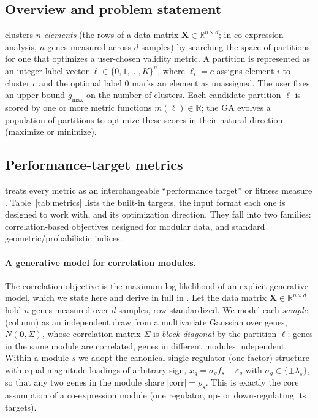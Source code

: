 \subsection*{Overview and problem statement}
\tool{} clusters $n$ \emph{elements} (the rows of a data matrix
$\mathbf{X}\in\mathbb{R}^{n\times d}$; in co-expression analysis, $n$ genes
measured across $d$ samples) by searching the space of partitions for one that
optimizes a user-chosen validity metric. A partition is represented as an
integer label vector $\boldsymbol{\ell}\in\{0,1,\dots,K\}^{n}$, where
$\ell_i = c$ assigns element $i$ to cluster $c$ and the optional label $0$ marks
an element as unassigned. The user fixes an upper bound $g_{\max}$ on the number
of clusters. Each candidate partition $\boldsymbol{\ell}$ is scored by one or
more metric functions $m(\boldsymbol{\ell})\in\mathbb{R}$; the GA evolves a
population of partitions to optimize these scores in their natural direction
(maximize or minimize).

\subsection*{Performance-target metrics}
\tool{} treats every metric as an interchangeable ``performance target'' or fitness measure \cite{wirsanskyHGA2020}. Table~\ref{tab:metrics} lists the built-in targets, the input format each one is designed to work with, and its optimization direction. They fall into two families: correlation-based objectives designed for modular data, and standard geometric/probabilistic indices.

\paragraph*{A generative model for correlation modules.}
The correlation objective is the maximum log-likelihood of an explicit
generative model, which we state here and derive in full in
. Let the data matrix $\mathbf{X}\in\mathbb{R}^{n\times d}$
hold $n$ genes measured over $d$ samples, row-standardized. We model each
\emph{sample} (column) as an independent draw from a multivariate Gaussian over
genes, $N(\mathbf{0},\Sigma)$, whose correlation matrix $\Sigma$ is
\emph{block-diagonal} by the partition $\boldsymbol{\ell}$: genes in the same
module are correlated, genes in different modules independent. Within a module
$s$ we adopt the canonical single-regulator (one-factor) structure with
equal-magnitude loadings of arbitrary sign, $x_g = \sigma_g f_s + \varepsilon_g$
with $\sigma_g\in\{\pm\lambda_s\}$, so that any two genes in the module share
$\lvert\mathrm{corr}\rvert = \rho_s$. This is exactly the core assumption of a
co-expression module (one regulator, up- or down-regulating its targets).

